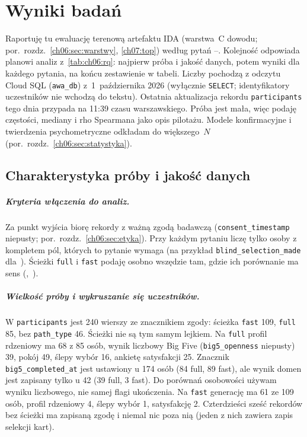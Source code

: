 \chapter{Wyniki badań}
\label{ch08:top}

Raportuję tu ewaluację terenową artefaktu IDA (warstwa~C dowodu; por.\ rozdz.~\ref{ch06:sec:warstwy}, \ref{ch07:top}) według pytań --.
Kolejność odpowiada planowi analiz z~\cref{tab:ch06:rq}: najpierw próba i jakość danych, potem wyniki dla każdego pytania, na końcu zestawienie w tabeli.
Liczby pochodzą z odczytu Cloud SQL (\texttt{awa\_db}) z~1~października 2026 (wyłącznie \texttt{SELECT}; identyfikatory uczestników nie wchodzą do tekstu).
Ostatnia aktualizacja rekordu \texttt{participants} tego dnia przypada na 11:39 czasu warszawskiego.
Próba jest mała, więc podaję częstości, mediany i rho Spearmana jako opis pilotażu. Modele konfirmacyjne i twierdzenia psychometryczne odkładam do większego~$N$ (por.\ rozdz.~\ref{ch06:sec:statystyka}).

\section{Charakterystyka próby i jakość danych}
\label{ch08:sec:proba}

\paragraph{Kryteria włączenia do analiz.}
Za punkt wyjścia biorę rekordy z ważną zgodą badawczą (\texttt{consent\_timestamp} niepusty; por.\ rozdz.~\ref{ch06:sec:etyka}). Przy każdym pytaniu liczę tylko osoby z kompletem pól, których to pytanie wymaga (na przykład \texttt{blind\_selection\_made} dla~).
Ścieżki \texttt{full} i \texttt{fast} podaję osobno wszędzie tam, gdzie ich porównanie ma sens (,~).

\paragraph{Wielkość próby i wykruszanie się uczestników.}
W \texttt{participants} jest 240 wierszy ze znacznikiem zgody: ścieżka \texttt{fast} 109, \texttt{full} 85, bez \texttt{path\_type} 46.
Ścieżki nie są tym samym lejkiem. Na \texttt{full} profil rdzeniowy ma 68 z 85 osób, wynik liczbowy Big Five (\texttt{big5\_openness} niepusty) 39, pokój 49, ślepy wybór 16, ankietę satysfakcji 25.
Znacznik \texttt{big5\_completed\_at} jest ustawiony u 174 osób (84 full, 89 fast), ale wynik domen jest zapisany tylko u 42 (39 full, 3 fast). Do porównań osobowości używam wyniku liczbowego, nie samej flagi ukończenia.
Na \texttt{fast} generację ma 61 ze 109 osób, profil rdzeniowy 4, ślepy wybór 1, satysfakcję 2. Czterdzieści sześć rekordów bez ścieżki ma zapisaną zgodę i niemal nic poza nią (jeden z nich zawiera zapis selekcji kart).


